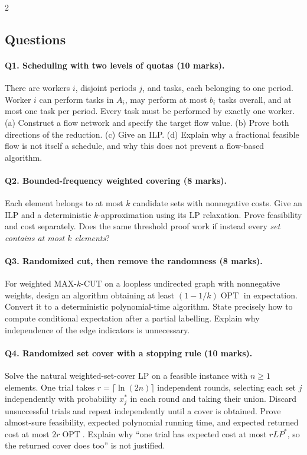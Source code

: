 \documentclass[10pt]{article}
\theoremstyle{definition}
\newcommand{\OPT}{\operatorname{OPT}}
\begin{document}
\begin{multicols*}{2}
\subsection{Questions}
\paragraph{Q1. Scheduling with two levels of quotas (10 marks).}
There are workers $i$, disjoint periods $j$, and tasks, each belonging to
one period.  Worker $i$ can perform tasks in $A_i$, may perform at most
$b_i$ tasks overall, and at most one task per period.  Every task must be
performed by exactly one worker.
(a) Construct a flow network and specify the target flow value.
(b) Prove both directions of the reduction.  (c) Give an ILP.
(d) Explain why a fractional feasible flow is not itself a schedule, and
why this does not prevent a flow-based algorithm.

\paragraph{Q2. Bounded-frequency weighted covering (8 marks).}
Each element belongs to at most $k$ candidate sets with nonnegative costs.
Give an ILP and a deterministic $k$-approximation using its LP relaxation.
Prove feasibility and cost separately.  Does the same threshold proof work
if instead every \emph{set contains at most $k$ elements}?

\paragraph{Q3. Randomized cut, then remove the randomness (8 marks).}
For weighted MAX-$k$-CUT on a loopless undirected graph with nonnegative
weights, design an algorithm obtaining at least $(1-1/k)\OPT$ in expectation.
Convert it to a deterministic polynomial-time algorithm.  State precisely
how to compute conditional expectation after a partial labelling.  Explain
why independence of the edge indicators is unnecessary.

\paragraph{Q4. Randomized set cover with a stopping rule (10 marks).}
Solve the natural weighted-set-cover LP on a feasible instance with $n\ge1$
elements.  One trial takes $r=\lceil\ln(2n)\rceil$ independent rounds,
selecting each set $j$ independently with probability $x_j^*$ in each round
and taking their union.  Discard unsuccessful trials and repeat independently
until a cover is obtained.  Prove almost-sure feasibility, expected polynomial
running time, and expected returned cost at most $2r\OPT$.  Explain why
``one trial has expected cost at most $rLP^*$, so the returned cover does
too'' is not justified.


\end{multicols*}
\end{document}
